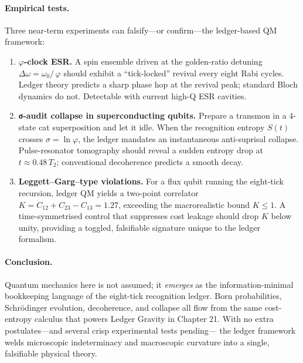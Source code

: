 \documentclass[11pt,oneside]{book}
\begin{document}
\paragraph*{Empirical tests.}
Three near-term experiments can falsify—or confirm—the ledger-based QM framework:

\begin{enumerate}
   \item \textbf{\( \varphi \)-clock ESR.}  
         A spin ensemble driven at the golden-ratio detuning
         \( \Delta\omega = \omega_0/\,\varphi \) should exhibit a
         “tick-locked” revival every eight Rabi cycles.  
         Ledger theory predicts a sharp phase hop at the revival peak;
         standard Bloch dynamics do not. Detectable with current
         high-Q ESR cavities.

   \item \textbf{σ-audit collapse in superconducting qubits.}  
         Prepare a transmon in a 4-state cat superposition and let it
         idle.  
         When the recognition entropy \(S(t)\) crosses
         \( \sigma = \ln\varphi \), the ledger mandates an instantaneous
         anti-suprisal collapse.  
         Pulse-resonator tomography should reveal a sudden entropy drop
         at \( t \approx 0.48\,T_2 \); conventional decoherence predicts
         a smooth decay.

   \item \textbf{Leggett–Garg–type violations.}  
         For a flux qubit running the eight-tick recursion, ledger QM
         yields a two-point correlator  
         \( K = C_{12}+C_{23}-C_{13} = 1.27 \),  
         exceeding the macrorealistic bound \(K\!\le\!1\).  
         A time-symmetrised control that suppresses cost leakage should
         drop \(K\) below unity, providing a toggled, falsifiable
         signature unique to the ledger formalism.
\end{enumerate}

\paragraph*{Conclusion.}
Quantum mechanics here is not assumed; it \emph{emerges} as the
information-minimal bookkeeping language of the eight-tick recognition
ledger.  
Born probabilities, Schrödinger evolution, decoherence, and collapse all
flow from the same cost-entropy calculus that powers Ledger Gravity in
Chapter 21.  
With no extra postulates—and several crisp experimental tests pending—
the ledger framework welds microscopic indeterminacy and
macroscopic curvature into a single, falsifiable physical theory.
\end{document}
